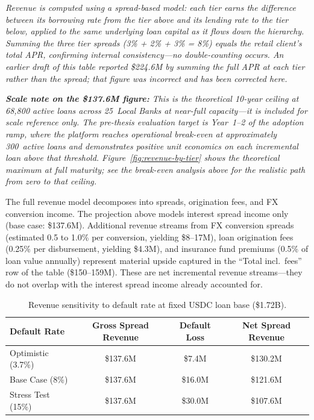 \documentclass[12pt,a4paper]{report}
\newcommand{\tableheadcolor}{\rowcolor{TableHeadBg}}
\newcommand{\tableheadfont}{\bfseries}
\begin{document}
\vspace{2pt}
\noindent\textit{\small Revenue is computed using a \textit{spread-based} model: each tier earns the difference between its borrowing rate from the tier above and its lending rate to the tier below, applied to the same underlying loan capital as it flows down the hierarchy. Summing the three tier spreads (3\% + 2\% + 3\% = 8\%) equals the retail client's total APR, confirming internal consistency---no double-counting occurs. An earlier draft of this table reported \$224.6M by summing the full APR at each tier rather than the spread; that figure was incorrect and has been corrected here.}

\vspace{4pt}
\noindent\textit{\small \textbf{Scale note on the \$137.6M figure:} This is the theoretical 10-year ceiling at 68,800 active loans across 25~Local Banks at near-full capacity---it is included for scale reference only. The pre-thesis evaluation target is Year~1--2 of the adoption ramp, where the platform reaches operational break-even at approximately 300~active loans and demonstrates positive unit economics on each incremental loan above that threshold. Figure~\ref{fig:revenue-by-tier} shows the theoretical maximum at full maturity; see the break-even analysis above for the realistic path from zero to that ceiling.}

\vspace{4pt}
\noindent The full revenue model decomposes into spreads, origination fees, and FX conversion income. The projection above models interest spread income only (base case: \$137.6M). Additional revenue streams from FX conversion spreads (estimated 0.5 to 1.0\% per conversion, yielding \$8--17M), loan origination fees (0.25\% per disbursement, yielding \$4.3M), and insurance fund premiums (0.5\% of loan value annually) represent material upside captured in the ``Total incl.\ fees'' row of the table (\$150--159M). These are net incremental revenue streams---they do not overlap with the interest spread income already accounted for.

\begin{table}[H]
\centering
\caption[Revenue sensitivity to default rate]{Revenue sensitivity to default rate at fixed USDC loan base (\$1.72B).}
\label{tab:revenue-sensitivity}
\begin{tabular}{@{}lccc@{}}
\toprule
\tableheadcolor
\tableheadfont Default Rate & \tableheadfont Gross Spread Revenue & \tableheadfont Default Loss & \tableheadfont Net Spread Revenue \\
\midrule
Optimistic (3.7\%) & \$137.6M & \$7.4M & \$130.2M \\
\rowcolor{RowShade}
Base Case (8\%) & \$137.6M & \$16.0M & \$121.6M \\
Stress Test (15\%) & \$137.6M & \$30.0M & \$107.6M \\
\bottomrule
\end{tabular}
\end{table}
\end{document}
